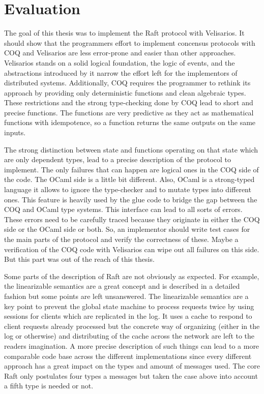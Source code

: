 %
\section{Evaluation}
\label{sec_5}

The goal of this thesis was to implement the Raft protocol
with Velisarios. It should show that the programmers
effort to implement concensus protocols with COQ and
Velisarios are less error-prone and easier than other
approaches. Velisarios stands on a solid
logical foundation, the logic of events, and the
abstractions introduced by it narrow the effort
left for the implementors of distributed systems.
Additionally, COQ requires the programmer to rethink
its approach by providing only deterministic functions
and clean algebraic types. These restrictions and
the strong type-checking done by COQ lead to short and
precise functions. The functions are very predictive as they
act as mathematical functions with idempotence, so
a function returns the same outputs on the same inputs.

The strong distinction between state and functions operating
on that state which are only dependent types, lead to a
precise description of the protocol to implement.
The only failures that can happen are logical ones
in the COQ side of the code. The OCaml side is a little
bit different. Also, OCaml is a strong-typed language
it allows to ignore the type-checker and to mutate
types into different ones. This feature is heavily
used by the glue code to bridge the gap between
the COQ and OCaml type systems. This interface
can lead to all sorts of errors. These errors need
to be carefully traced because they originate in either
the COQ side or the OCaml side or both. So, an implementor
should write test cases for the main parts of the protocol
and verify the correctness of these. Maybe a verification
of the COQ code with Velisarios 
can wipe out all failures on this side. But this part
was out of the reach of this thesis. 

Some parts of the description of Raft are not
obviously as expected. For example, the linearizable
semantics are a great concept and is described in a
detailed fashion but some points are left unsanswered.
The linearizable semantics are a key point to
prevent the global state machine to process requests
twice by using sessions for clients which are replicated
in the log. It uses a cache to respond to client requests
already processed but the concrete way of organizing
(either in the log or otherwise) and distributing of
the cache across the network are left to the readers
imagination. A more precise description of such things
can lead to a more comparable code base across the
different implementations since every different approach
has a great impact on the types and amount of messages
used. The core Raft only postulates four types
a messages but taken the case above into account a fifth
type is needed or not.

